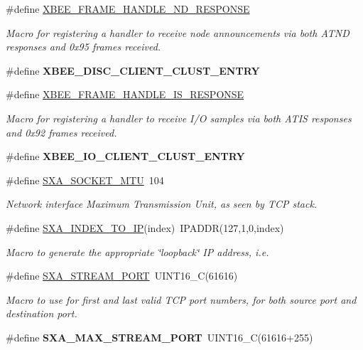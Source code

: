 \begin{DoxyCompactItemize}
\item 
\#define \hyperlink{group___s_x_a_ga988e2b4c52622034d041f38848881a09}{X\-B\-E\-E\-\_\-\-F\-R\-A\-M\-E\-\_\-\-H\-A\-N\-D\-L\-E\-\_\-\-N\-D\-\_\-\-R\-E\-S\-P\-O\-N\-S\-E}
\begin{DoxyCompactList}\small\item\em Macro for registering a handler to receive node announcements via both A\-T\-N\-D responses and 0x95 frames received. \end{DoxyCompactList}\item 
\#define {\bfseries X\-B\-E\-E\-\_\-\-D\-I\-S\-C\-\_\-\-C\-L\-I\-E\-N\-T\-\_\-\-C\-L\-U\-S\-T\-\_\-\-E\-N\-T\-R\-Y}
\item 
\#define \hyperlink{group___s_x_a_ga4ef8415bf147396546ed97d7fc7ef8fd}{X\-B\-E\-E\-\_\-\-F\-R\-A\-M\-E\-\_\-\-H\-A\-N\-D\-L\-E\-\_\-\-I\-S\-\_\-\-R\-E\-S\-P\-O\-N\-S\-E}
\begin{DoxyCompactList}\small\item\em Macro for registering a handler to receive I/\-O samples via both A\-T\-I\-S responses and 0x92 frames received. \end{DoxyCompactList}\item 
\#define {\bfseries X\-B\-E\-E\-\_\-\-I\-O\-\_\-\-C\-L\-I\-E\-N\-T\-\_\-\-C\-L\-U\-S\-T\-\_\-\-E\-N\-T\-R\-Y}
\item 
\#define \hyperlink{group___s_x_a_ga24cd1c18c4568b532a09c4d3ae6a3700}{S\-X\-A\-\_\-\-S\-O\-C\-K\-E\-T\-\_\-\-M\-T\-U}~104
\begin{DoxyCompactList}\small\item\em Network interface Maximum Transmission Unit, as seen by T\-C\-P stack. \end{DoxyCompactList}\item 
\#define \hyperlink{group___s_x_a_ga0ae330bea7b42c331e9f473387e5766b}{S\-X\-A\-\_\-\-I\-N\-D\-E\-X\-\_\-\-T\-O\-\_\-\-I\-P}(index)~I\-P\-A\-D\-D\-R(127,1,0,index)
\begin{DoxyCompactList}\small\item\em Macro to generate the appropriate \char`\"{}loopback\char`\"{} I\-P address, i.\-e. \end{DoxyCompactList}\item 
\#define \hyperlink{group___s_x_a_ga686d56084362bb9152a4d5e6b048b80d}{S\-X\-A\-\_\-\-S\-T\-R\-E\-A\-M\-\_\-\-P\-O\-R\-T}~U\-I\-N\-T16\-\_\-\-C(61616)
\begin{DoxyCompactList}\small\item\em Macro to use for first and last valid T\-C\-P port numbers, for both source port and destination port. \end{DoxyCompactList}\item 
\hypertarget{group___s_x_a_gab048ec29a4d3a7904f5aec7986ddcf6e}{\#define {\bfseries S\-X\-A\-\_\-\-M\-A\-X\-\_\-\-S\-T\-R\-E\-A\-M\-\_\-\-P\-O\-R\-T}~U\-I\-N\-T16\-\_\-\-C(61616+255)}\label{group___s_x_a_gab048ec29a4d3a7904f5aec7986ddcf6e}


\end{DoxyCompactItemize}
